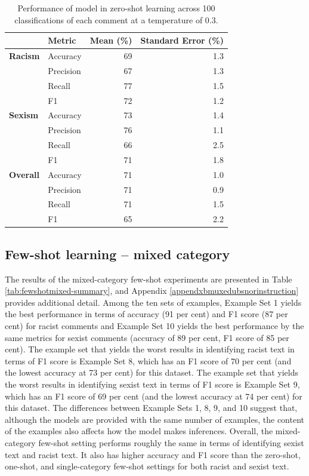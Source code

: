 \documentclass[12pt,]{article}
\begin{document}
\begin{table}

\caption{\label{tab:fewshotsingle-summary}Performance of model in zero-shot learning across 100 classifications of each comment at a temperature of 0.3.}
\centering
\begin{tabular}[t]{>{}llrr}
\toprule
 & Metric & Mean (\%) & Standard Error (\%)\\
\midrule
\textbf{Racism} & Accuracy & 69 & 1.3\\
\textbf{} & Precision & 67 & 1.3\\
\textbf{} & Recall & 77 & 1.5\\
\textbf{} & F1 & 72 & 1.2\\
\textbf{Sexism} & Accuracy & 73 & 1.4\\
\textbf{} & Precision & 76 & 1.1\\
\textbf{} & Recall & 66 & 2.5\\
\textbf{} & F1 & 71 & 1.8\\
\textbf{Overall} & Accuracy & 71 & 1.0\\
\textbf{} & Precision & 71 & 0.9\\
\textbf{} & Recall & 71 & 1.5\\
\textbf{} & F1 & 65 & 2.2\\
\bottomrule
\end{tabular}
\end{table}

\hypertarget{few-shot-learning-mixed-category}{%
\subsection{Few-shot learning -- mixed category}\label{few-shot-learning-mixed-category}}

The results of the mixed-category few-shot experiments are presented in Table \ref{tab:fewshotmixed-summary}, and Appendix \ref{appendxbmuxedubsnorinstruction} provides additional detail. Among the ten sets of examples, Example Set 1 yields the best performance in terms of accuracy (91 per cent) and F1 score (87 per cent) for racist comments and Example Set 10 yields the best performance by the same metrics for sexist comments (accuracy of 89 per cent, F1 score of 85 per cent). The example set that yields the worst results in identifying racist text in terms of F1 score is Example Set 8, which has an F1 score of 70 per cent (and the lowest accuracy at 73 per cent) for this dataset. The example set that yields the worst results in identifying sexist text in terms of F1 score is Example Set 9, which has an F1 score of 69 per cent (and the lowest accuracy at 74 per cent) for this dataset. The differences between Example Sets 1, 8, 9, and 10 suggest that, although the models are provided with the same number of examples, the content of the examples also affects how the model makes inferences. Overall, the mixed-category few-shot setting performs roughly the same in terms of identifying sexist text and racist text. It also has higher accuracy and F1 score than the zero-shot, one-shot, and single-category few-shot settings for both racist and sexist text.
\end{document}

